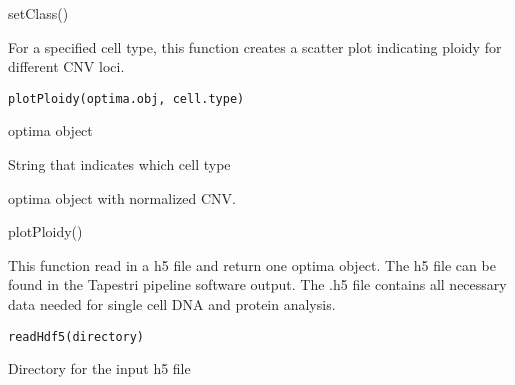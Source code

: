 \documentclass[a4paper]{book}
\begin{document}
%
\begin{Examples}
\begin{ExampleCode}
setClass()
\end{ExampleCode}
\end{Examples}
%
\begin{Description}\relax
For a specified cell type, this function creates a scatter plot indicating
ploidy for different CNV loci.
\end{Description}
%
\begin{Usage}
\begin{verbatim}
plotPloidy(optima.obj, cell.type)
\end{verbatim}
\end{Usage}
%
\begin{Arguments}
\begin{ldescription}
\item[\code{optima.obj}] optima object

\item[\code{cell.type}] String that indicates which cell type
\end{ldescription}
\end{Arguments}
%
\begin{Value}
optima object with normalized CNV.
\end{Value}
%
\begin{Examples}
\begin{ExampleCode}
plotPloidy()
\end{ExampleCode}
\end{Examples}
%
\begin{Description}\relax
This function read in a h5 file and return one optima object. The
h5 file can be found in the Tapestri pipeline software output. The .h5
file contains all necessary data needed for single cell DNA and protein
analysis.
\end{Description}
%
\begin{Usage}
\begin{verbatim}
readHdf5(directory)
\end{verbatim}
\end{Usage}
%
\begin{Arguments}
\begin{ldescription}
\item[\code{directory}] Directory for the input h5 file
\end{ldescription}
\end{Arguments}
\end{document}
